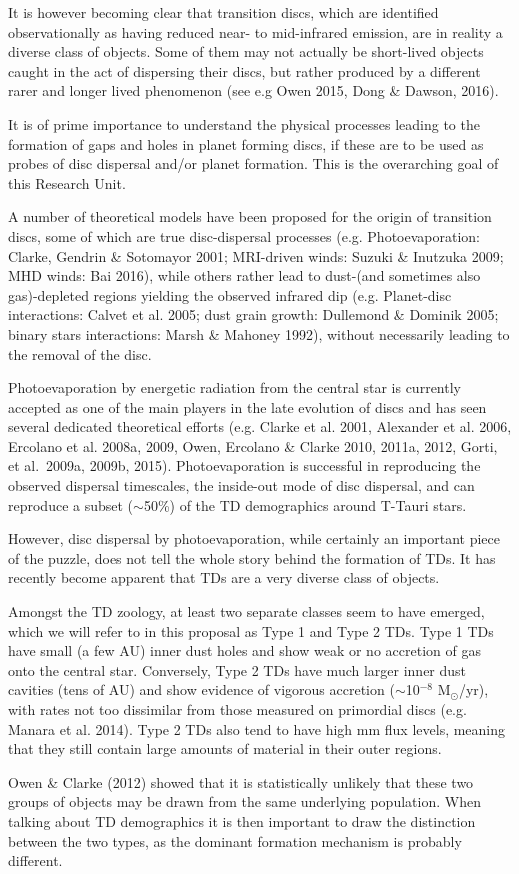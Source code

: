 \documentclass[10pt,fleqn,twoside]{article}
\begin{document}
It is however becoming clear that transition discs, which are
identified observationally as having reduced near- to mid-infrared
emission,  are in reality a diverse class of objects. Some of them may
not actually be short-lived objects caught in the act of dispersing
their discs, but rather produced by a different rarer and longer lived
phenomenon (see e.g Owen 2015, Dong \& Dawson, 2016). 
\begin{highlight}
It is of prime
importance to understand the physical processes leading to the
formation of gaps and holes in planet forming discs, if these are to
be used as probes of disc dispersal and/or  planet formation. This is
the overarching goal of this Research Unit. 
\end{highlight}


A number of theoretical models have been proposed for the origin of
transition discs, some of which are true disc-dispersal processes
(e.g. Photoevaporation: Clarke, Gendrin \& Sotomayor 2001; MRI-driven
winds: Suzuki \& Inutzuka 2009; MHD winds: Bai 2016), while others
rather lead to dust-(and sometimes also gas)-depleted regions yielding
the observed infrared dip (e.g. Planet-disc interactions: Calvet et
al. 2005; dust grain growth: Dullemond \& Dominik 2005; binary stars
interactions: Marsh \& Mahoney 1992), without necessarily leading to
the removal of the disc.  

Photoevaporation by energetic radiation from the central star is currently accepted as one of
the main players in the late evolution of discs and has seen several
dedicated theoretical efforts (e.g. Clarke et al. 2001, Alexander et
al. 2006, Ercolano et al. 2008a, 2009, Owen, Ercolano \& Clarke 2010, 2011a,
2012, Gorti, et al.\ 2009a, 2009b, 2015). Photoevaporation is
successful in reproducing the observed dispersal timescales, the
inside-out mode of disc dispersal, and can reproduce a subset
($\sim$50\%) of the TD demographics around T-Tauri stars.

However, disc dispersal by photoevaporation, while certainly an important piece of the
puzzle, does not tell the whole story behind the formation of TDs. It
has recently become apparent that TDs are a very diverse
class of objects. 
\begin{highlight}
Amongst the TD zoology, at least two separate classes seem
to have emerged, which we will refer to in this proposal as Type 1 and
Type 2 TDs. Type 1 TDs have small (a few AU) inner dust holes and show weak or no accretion of
gas onto the central star. Conversely, Type
2 TDs have much larger inner dust cavities (tens of AU) and show evidence of vigorous accretion ($\sim$10$^{-8}$
M$_{\odot}$/yr), with rates not too dissimilar from those measured
on primordial discs (e.g. Manara et al. 2014). 
Type 2 TDs also tend to have high mm flux levels, meaning that
they still contain large amounts of material in their outer
regions. 
\end{highlight}
Owen \& Clarke (2012) showed that it is statistically
unlikely that these two groups of objects may be drawn from the same
underlying population. When talking about TD demographics it is then
important to draw the distinction between the two types, as the
dominant formation mechanism is probably different. 
\end{document}
